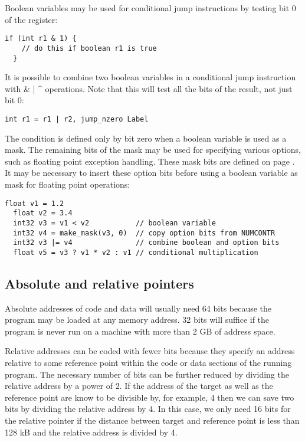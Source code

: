 \documentclass[forwardcom.tex]{subfiles}
\begin{document}
Boolean variables may be used for conditional jump instructions by testing bit 0 of the register:
\begin{lstlisting}[frame=single]
  if (int r1 & 1) {
    // do this if boolean r1 is true
  }
\end{lstlisting}
\vv

It is possible to combine two boolean variables in a conditional jump instruction with \hspace{2mm} \& \hspace{2mm} $\vert$ \hspace{2mm} \^{} \hspace{2mm} operations. Note that this will test all the bits of the result, not just bit 0:

\begin{lstlisting}[frame=single]
  int r1 = r1 | r2, jump_nzero Label
\end{lstlisting}
\vv

The condition is defined only by bit zero when a boolean variable is used as a mask. The remaining bits of the mask may be used for specifying various options, such as floating point exception handling. These mask bits are defined on page \pageref{table:maskBits}. It may be necessary to insert these option bits before using a boolean variable as mask for floating point operations:

\begin{lstlisting}[frame=single]
  float v1 = 1.2
  float v2 = 3.4
  int32 v3 = v1 < v2           // boolean variable
  int32 v4 = make_mask(v3, 0)  // copy option bits from NUMCONTR
  int32 v3 |= v4               // combine boolean and option bits
  float v5 = v3 ? v1 * v2 : v1 // conditional multiplication
\end{lstlisting}
\vv


\subsection{Absolute and relative pointers} \label{AbsoluteAndRelativePointers}

Absolute addresses of code and data will usually need 64 bits because the program may be loaded at any memory address. 32 bits will suffice if the program is never run on a machine with more than 2 GB of address space.
\vv

Relative addresses can be coded with fewer bits because they specify an address relative to some reference point within the code or data sections of the running program. The necessary number of bits can be further reduced by dividing the relative address by a power of 2. If the address of the target as well as the reference point are know to be divisible by, for example, 4 then we can save two bits by dividing the relative address by 4. In this case, we only need 16 bits for the relative pointer if the distance between target and reference point is less than 128 kB and the relative address is divided by 4.
\vv
\end{document}
